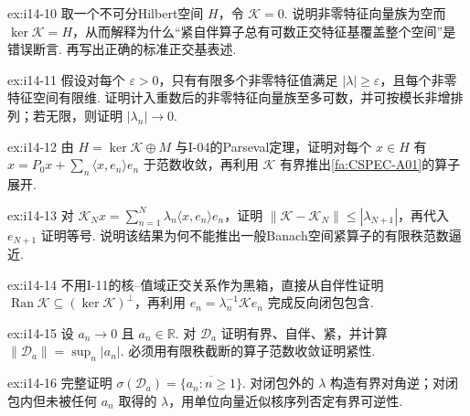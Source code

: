 \begin{FAExercise}[不可分核边界]{ex:i14-10}
取一个不可分Hilbert空间 \(\displaystyle H\)，令 \(\displaystyle \mathcal K=0\). 说明非零特征向量族为空而 \(\displaystyle \ker\mathcal K=H\)，从而解释为什么“紧自伴算子总有可数正交特征基覆盖整个空间”是错误断言. 再写出正确的标准正交基表述.
\end{FAExercise}

\begin{FAExercise}[非零特征值枚举]{ex:i14-11}
假设对每个 \(\displaystyle \varepsilon>0\)，只有有限多个非零特征值满足 \(\displaystyle |\lambda|\geqslant\varepsilon\)，且每个非零特征空间有限维. 证明计入重数后的非零特征向量族至多可数，并可按模长非增排列；若无限，则证明 \(\displaystyle |\lambda_n|\to0\).
\end{FAExercise}

\begin{FAExercise}[特征展开]{ex:i14-12}
由 \(\displaystyle H=\ker\mathcal K\oplus M\) 与I-04的Parseval定理，证明对每个 \(\displaystyle x\in H\) 有 \(\displaystyle x=P_0x+\sum_n\langle x,e_n\rangle e_n\) 于范数收敛，再利用 \(\displaystyle \mathcal K\) 有界推出\autoref{fa:CSPEC-A01}的算子展开.
\end{FAExercise}

\begin{FAExercise}[谱有限秩截断]{ex:i14-13}
对 \(\displaystyle \mathcal K_Nx=\sum_{n=1}^{N}\lambda_n\langle x,e_n\rangle e_n\)，证明 \(\displaystyle \|\mathcal K-\mathcal K_N\|\leqslant|\lambda_{N+1}|\)，再代入 \(\displaystyle e_{N+1}\) 证明等号. 说明该结果为何不能推出一般Banach空间紧算子的有限秩范数逼近.
\end{FAExercise}

\begin{FAExercise}[值域闭包]{ex:i14-14}
不用I-11的核--值域正交关系作为黑箱，直接从自伴性证明 \(\displaystyle \operatorname{Ran}\mathcal K\subseteq(\ker\mathcal K)^\perp\)，再利用 \(\displaystyle e_n=\lambda_n^{-1}\mathcal Ke_n\) 完成反向闭包包含.
\end{FAExercise}

\begin{FAExercise}[紧对角算子]{ex:i14-15}
设 \(\displaystyle a_n\to0\) 且 \(\displaystyle a_n\in\mathbb R\). 对 \(\displaystyle \mathcal D_a\) 证明有界、自伴、紧，并计算 \(\displaystyle \|\mathcal D_a\|=\sup_n|a_n|\). 必须用有限秩截断的算子范数收敛证明紧性.
\end{FAExercise}

\begin{FAExercise}[对角算子的谱]{ex:i14-16}
完整证明 \(\displaystyle \sigma(\mathcal D_a)=\overline{\{a_n:n\geqslant1\}}\). 对闭包外的 \(\displaystyle \lambda\) 构造有界对角逆；对闭包内但未被任何 \(\displaystyle a_n\) 取得的 \(\displaystyle \lambda\)，用单位向量近似核序列否定有界可逆性.
\end{FAExercise}

